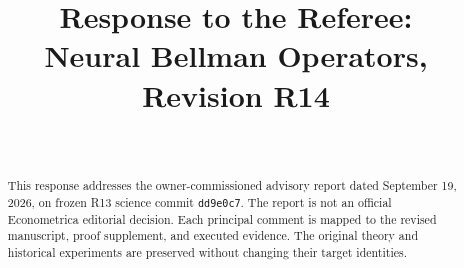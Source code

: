 \documentclass[ecta]{econsocart}
\begin{document}
\begin{frontmatter}
\title{Response to the Referee:\\Neural Bellman Operators, Revision R14}
\begin{aug}
\author[id=au1,addressref={add1}]{~}
\address[id=add1]{}
\end{aug}
\begin{abstract}
This response addresses the owner-commissioned advisory report dated September 19, 2026, on frozen R13 science commit \texttt{dd9e0c7}. The report is not an official Econometrica editorial decision. Each principal comment is mapped to the revised manuscript, proof supplement, and executed evidence. The original theory and historical experiments are preserved without changing their target identities.
\end{abstract}
\end{frontmatter}

\end{document}
